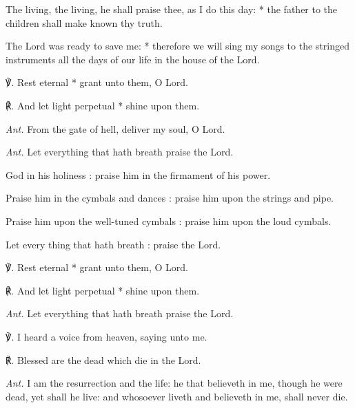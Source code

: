 The living, the living, he shall praise thee, as I do this day: * the father to the children shall make known thy truth.\par
The Lord was ready to save me: * therefore we will sing my songs to the stringed instruments all the days of our life in the house of the Lord.\par
℣. Rest eternal * grant unto them, O Lord.\par
℟. And let light perpetual * shine upon them.\par\noindent
\textit{Ant.} From the gate of hell, deliver my soul, O Lord.\par
\vspace{-1.75ex}
\par\noindent
\textit{Ant.} Let everything that hath breath {\dag} praise the Lord.\par
{} God in his holiness : praise him in the firmament of his power.\par
{}
Praise him in the cymbals and dances : praise him upon the strings and pipe.\par
{}Praise him upon the well-tuned cymbals : praise him upon the loud cymbals.\par
{}Let every thing that hath breath : praise the Lord.\par
℣. Rest eternal * grant unto them, O Lord.\par
℟. And let light perpetual * shine upon them.\par\noindent
\textit{Ant.} Let everything that hath breath praise the Lord.\par
℣. I heard a voice from heaven, saying unto me.\par
℟. Blessed are the dead which die in the Lord.\par
\vspace{-1ex}
\par\noindent
\textit{Ant.} I am the resurrection {\dag} and the life: he that believeth in me, though he were dead, yet shall he live: and whosoever liveth and believeth in me, shall never die.
